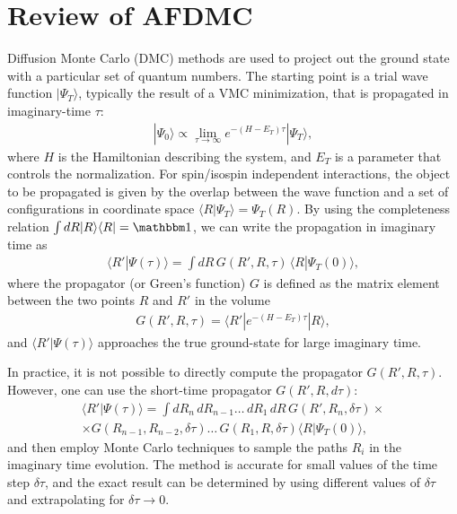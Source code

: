 \documentclass[aps,prc,twocolumn,superscriptaddress,showpacs,floatfix,nofootinbib]{revtex4-1}
\begin{document}
\section{Review of AFDMC}
\label{sec:afdmc}
Diffusion Monte Carlo (DMC) methods are used to project out the ground state
with a particular set of quantum numbers. The starting point is a trial wave
function $|\Psi_T\rangle$, typically the result of a VMC minimization, that is
propagated in imaginary-time $\tau$:
\begin{align}
|\Psi_0\rangle\propto \lim_{\tau\rightarrow\infty} e^{-(H-E_T)\tau}|\Psi_T\rangle ,
\end{align}
where $H$ is the Hamiltonian describing the system, and $E_T$ is a parameter that 
controls the normalization. 
For spin/isospin independent interactions, the object to be propagated 
is given by the overlap between the wave function and a set of configurations in 
coordinate space $\langle R|\Psi_T\rangle=\Psi_T(R)$. 
By using the completeness relation $\int dR |R\rangle\langle R|=\mathbbm1$,
we can write the propagation in imaginary time as
\begin{align}
\langle R'|\Psi(\tau)\rangle=\displaystyle\int dR\,G(R',R,\tau)\,\langle R|\Psi_T(0)\rangle ,
\label{eq:imtimeprop}
\end{align}
where the propagator (or Green's function) $G$ is defined as the matrix element between
the two points $R$ and $R'$ in the volume
\begin{align}
G(R',R,\tau)=\langle R'|e^{-(H-E_T)\tau}|R\rangle,
\end{align}
and $\langle R'|\Psi(\tau)\rangle$ approaches the true ground-state 
for large imaginary time.

In practice, it is not possible to directly compute
the propagator $G(R',R,\tau)$. 
However, one can use the short-time propagator $G(R',R,d\tau)$:
\begin{align}
\langle R'|\Psi(\tau)\rangle=
\int dR_n\,dR_{n-1}\ldots\,dR_1\,dR\,G(R',R_n,\delta\tau)\times\nonumber \\
\times G(R_{n-1},R_{n-2},\delta\tau)\ldots\,G(R_1,R,\delta\tau)
\langle R|\Psi_T(0)\rangle,
\end{align}
and then employ Monte Carlo techniques to sample the paths $R_i$ in the
imaginary time evolution. The method is accurate for small values of 
the time step $\delta\tau$, and the exact result 
can be determined by using different values of $\delta\tau$ 
and extrapolating for $\delta\tau\to0$.
\end{document}
